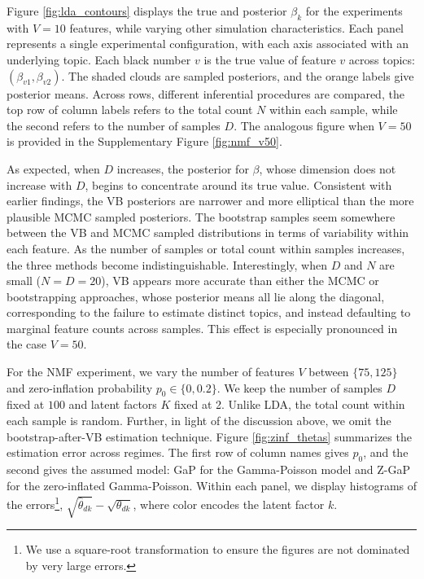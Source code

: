 \documentclass[oupdraft]{bio}
\begin{document}
Figure \ref{fig:lda_contours} displays the true and posterior $\beta_{k}$ for
the experiments with $V = 10$ features, while varying other simulation characteristics.
Each panel represents a single experimental configuration, with each
axis associated with an underlying topic. Each black number $v$ is the
true value of feature $v$ across topics: $\left(\beta_{v1}, \beta_{v2}\right)$.
The shaded clouds are sampled posteriors, and the orange labels give posterior
means. Across rows, different inferential procedures are compared, the top row of
column labels refers to the total count $N$ within each sample, while the second
refers to the number of samples $D$. The analogous figure when $V = 50$ is
provided in the Supplementary Figure \ref{fig:nmf_v50}.

As expected, when $D$ increases, the posterior for $\beta$, whose dimension does
not increase with $D$, begins to concentrate around its true value. Consistent
with earlier findings, the VB posteriors are narrower and more elliptical than
the more plausible MCMC sampled posteriors. The bootstrap samples seem somewhere
between the VB and MCMC sampled distributions in terms of variability within
each feature. As the number of samples or total count within samples increases,
the three methods become indistinguishable. Interestingly, when $D$ and $N$ are
small ($N = D = 20$), VB appears more accurate than either the MCMC or
bootstrapping approaches, whose posterior means all lie along the diagonal,
corresponding to the failure to estimate distinct topics, and instead defaulting
to marginal feature counts across samples. This effect is especially pronounced
in the case $V = 50$.

For the NMF experiment, we vary the number of features $V$ between $\{75, 125\}$
and zero-inflation probability $p_{0} \in \{0, 0.2\}$. We keep the number of samples
$D$ fixed at $100$ and latent factors $K$ fixed at 2. Unlike LDA, the total
count within each sample is random. Further, in light of the discussion above,
we omit the bootstrap-after-VB estimation technique. Figure
\ref{fig:zinf_thetas} summarizes the estimation error across regimes. The first
row of column names gives $p_{0}$, and the second gives the assumed model: GaP
for the Gamma-Poisson model and Z-GaP for the zero-inflated Gamma-Poisson.
Within each panel, we display histograms of the errors\footnote{We use a
  square-root transformation to ensure the figures are not dominated by very
  large errors.}, $\sqrt{\hat{\theta}_{dk}} - \sqrt{\theta_{dk}}$, where color
encodes the latent factor $k$.
\end{document}
